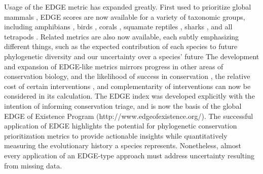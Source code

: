 \documentclass[10pt,english]{article}
\begin{document}
Usage of the EDGE metric has expanded greatly. First used to prioritize global
mammals \autocite{Isaac2007}, EDGE scores are now available for a variety of
taxonomic groups, including amphibians \autocite{Isaac2012}, birds
\autocite{Jetz2014}, corals \autocite{Curnick2015}, squamate reptiles
\autocite{Tonini2016}, sharks \autocite{Stein2018}, and all tetrapods
\autocite{Gumbs2018}. Related metrics are also now available, each subtly
emphasizing different things, such as the expected contribution of each species
to future phylogenetic diversity \autocite[HEDGE,
I-HEDGE;][]{Steel2007,Jensen2016} and our uncertainty over a species' future
\autocite[EDAM;][]{Pearse2015} The development and expansion of EDGE-like
metrics mirrors progress in other areas of conservation biology, and the
likelihood of success in conservation \autocite{Wilson2007, Mcbride2007}, the
relative cost of certain interventions \autocite{Naidoo2006}, and
complementarity of interventions \autocite{Pressey1993, Myers2000} can now be
considered in its calculation. The EDGE index was developed explicitly with the
intention of informing conservation triage, and is now the basis of the global
EDGE of Existence Program (http://www.edgeofexistence.org/). The successful
application of EDGE highlights the potential for phylogenetic conservation
prioritization metrics to provide actionable insights while quantitatively
measuring the evolutionary history a species represents. Nonetheless, almost
every application of an EDGE-type approach must address uncertainty resulting
from missing data.
\end{document}

